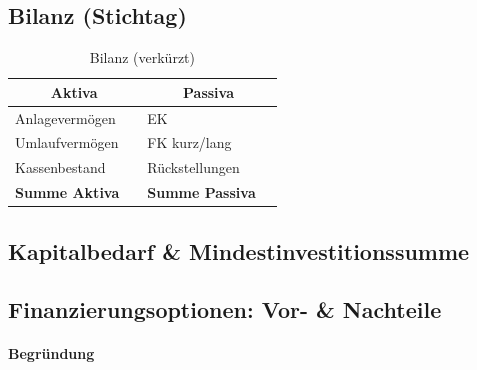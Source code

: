 \documentclass[
%
ngerman %
%
numeric %
]{wbh-assignment}
\begin{document}
\subsection{Bilanz (Stichtag)}
\begin{table}[htb!]
\centering
\caption{Bilanz (verkürzt)}
\begin{tabular}{l r l r}
\multicolumn{2}{c}{\textbf{Aktiva}} & \multicolumn{2}{c}{\textbf{Passiva}} \\
\hline
Anlagevermögen & \hspace{6em} & EK & \hspace{6em} \\
Umlaufvermögen & & FK kurz/lang & \\
Kassenbestand & & Rückstellungen & \\
\textbf{Summe Aktiva} & & \textbf{Summe Passiva} & \\
\end{tabular}
\end{table}

\subsection{Kapitalbedarf \& Mindestinvestitionssumme}

\subsection{Finanzierungsoptionen: Vor- \& Nachteile}

\paragraph{Begründung}
\end{document}
